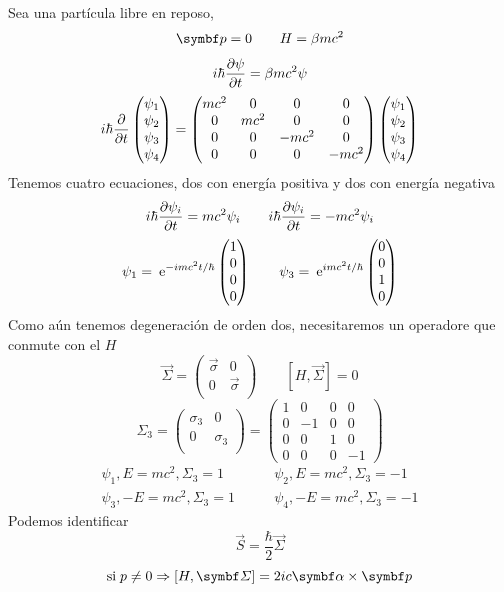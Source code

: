 \documentclass[10pt,oneside]{CBFT_book}
\begin{document}
Sea una partícula libre en reposo,
\[
	\vb{p} = 0 \qquad H=\beta m c^2
\]
\[
	i \hbar \frac{\partial^{\hspace{-0.05em}} {\psi}}{\partial {t}^{\hspace{-0.05em}}} = \beta m c^2 \psi
\]
\[
	i \hbar \frac{\partial^{\hspace{-0.05em}} {}}{\partial {t}^{\hspace{-0.05em}}} \begin{pmatrix} \psi_1 \\ \psi_2 \\ \psi_3 \\ \psi_4  \end{pmatrix} =
	\begin{pmatrix} mc^2 & 0 & 0 & 0 \\ 0 & mc^2 & 0 & 0 \\ 0 & 0 & -mc^2 & 0 \\ 0 & 0 & 0 & -mc^2 \end{pmatrix}
	\begin{pmatrix} \psi_1 \\ \psi_2 \\ \psi_3 \\ \psi_4  \end{pmatrix}
\]
Tenemos cuatro ecuaciones, dos con energía positiva y dos con energía negativa
\[
	i \hbar \frac{\partial^{\hspace{-0.05em}} {\psi_i}}{\partial {t}^{\hspace{-0.05em}}} = mc^2 \psi_i \qquad i \hbar \frac{\partial^{\hspace{-0.05em}} {\psi_i}}{\partial {t}^{\hspace{-0.05em}}} = -mc^2 \psi_i
\]
\[
	\psi_1 = \:\mathrm{e}^{-imc^2t/\hbar}\begin{pmatrix} 1 \\ 0 \\ 0 \\ 0  \end{pmatrix} \qquad 
	\psi_3 = \:\mathrm{e}^{imc^2t/\hbar}\begin{pmatrix} 0 \\ 0 \\ 1 \\ 0  \end{pmatrix}
\]
Como aún tenemos degeneración de orden dos, necesitaremos un operadore que conmute con el $H$
\[
	\vec{\Sigma} = \begin{pmatrix} \vec{\sigma} & 0 \\ 0 & \vec{\sigma} \\ \end{pmatrix} \qquad 
	[H,\vec{\Sigma}] = 0
\]
\[
	\Sigma_3 =  \begin{pmatrix} \sigma_3 & 0 \\ 0 & \sigma_3 \\ \end{pmatrix} = 
	\begin{pmatrix} 1 & 0 & 0 & 0 \\ 0 & -1 & 0 & 0 \\ 0 & 0 & 1 & 0 \\ 0 & 0 & 0 & -1 \end{pmatrix}
\]
\begin{align*}
	\psi_1, E=mc^2, \Sigma_3=1 \qquad  &\psi_2, E=mc^2, \Sigma_3=-1 \\
	\psi_3, -E=mc^2, \Sigma_3=1 \qquad  &\psi_4, -E=mc^2, \Sigma_3=-1
\end{align*}
Podemos identificar 
\[
	\vec{S} = \frac{\hbar}{2} \vec{\Sigma}
\]
\[
	\text{si} \; p \neq 0  \Rightarrow [H, \vb{\Sigma}] = 2ic \vb{\alpha} \times \vb{p}
\]
\end{document}
